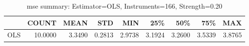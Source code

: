 \begin{table}[ht]
\centering
\caption{mse summary: Estimator=OLS, Instruments=166, Strength=0.20}
\begin{tabular}{lrrrrrrrr}
\toprule
 & COUNT & MEAN & STD & MIN & 25\% & 50\% & 75\% & MAX \\
\midrule
OLS & 10.0000 & 3.3490 & 0.2813 & 2.9738 & 3.1924 & 3.2600 & 3.5339 & 3.8765 \\
\bottomrule
\end{tabular}
\end{table}
